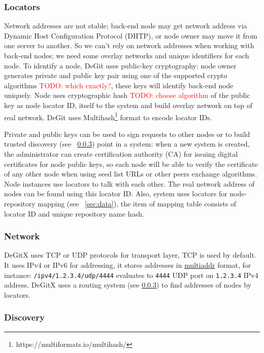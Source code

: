 \documentclass[acmlarge, screen, nonacm]{acmart}
\newcommand{\code}[1]{\texttt{#1}}
\newcommand{\todo}[1]{\textcolor{red}{TODO: #1}}
\begin{document}
\subsubsection{Locators}
\label{sec:locators}
Network addresses are not stable; back-end node may get network address via
Dynamic Host Configuration Protocol (DHTP), or node owner may move it from one server to another.
So we can't rely on network addresses when working with back-end nodes; we need some
overlay networks and unique identifiers for each node. To identify a node, DeGit uses
public-key cryptography: node owner generates private and public key pair using one of the supported
crypto algorithms \todo{which exactly?}, these keys will identify back-end node uniquely.
Node uses cryptographic hash \todo{choose algorithm} of the public key as node locator ID,
itself to the system and build overlay network on top of real network. DeGit uses
Multihash\footnote{https://multiformats.io/multihash/} format to encode locator IDs.

Private and public keys can be used to sign requests to other nodes or to build
trusted discovery (see ~\ref{sec:discovery}) point in a system: when a new system is created,
the administrator can create certification authority (CA) for issuing digital certificates for node
public keys, so each node will be able to verify the certificate of any other node when
using seed list URLs or other peers exchange algorithms. Node instances use locators to talk
with each other. The real network address of nodes can be found using this locator ID.
Also, system uses locators for node-repository mapping (see ~\ref{sec:data}),
the item of mapping table consists of locator ID and unique repository name hash.

\subsubsection{Network}
\label{sec:network}

DeGitX uses TCP or UDP protocols for transport layer, TCP is used by default. It uses IPv4 or IPv6 for addressing,
it stores addresses in \href{https://github.com/multiformats/multiaddr}{multiaddr} format, for instance:
\code{/ipv4/1.2.3.4/udp/4444} evaluates to \code{4444} UDP port on \code{1.2.3.4} IPv4 address.
DeGitX uses a routing system (see \ref{sec:discovery}) to find addresses of nodes by locators.

\subsubsection{Discovery}
\label{sec:discovery}
\end{document}
